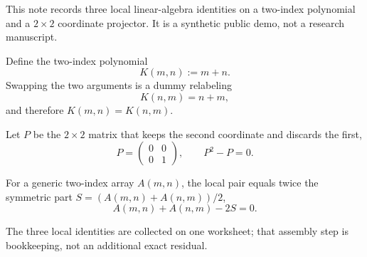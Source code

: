 \documentclass{article}
\begin{document}
This note records three local linear-algebra identities on a two-index
polynomial and a $2\times 2$ coordinate projector. It is a synthetic
public demo, not a research manuscript.

Define the two-index polynomial
\begin{equation}
\label{eq:K-def}
K(m,n) := m+n.
\end{equation}
Swapping the two arguments is a dummy relabeling
\begin{equation}
\label{eq:K-swap}
K(n,m) = n+m,
\end{equation}
and therefore $K(m,n)=K(n,m)$.

Let $P$ be the $2\times 2$ matrix that keeps the second coordinate and
discards the first,
\begin{equation}
\label{eq:projector}
P = \begin{pmatrix} 0 & 0 \\ 0 & 1 \end{pmatrix},
\qquad
P^{2}-P = 0.
\end{equation}

For a generic two-index array $A(m,n)$, the local pair equals twice the
symmetric part $S=(A(m,n)+A(n,m))/2$,
\begin{equation}
\label{eq:pairwise}
A(m,n)+A(n,m)-2S = 0.
\end{equation}

The three local identities are collected on one worksheet; that assembly
step is bookkeeping, not an additional exact residual.
\end{document}

